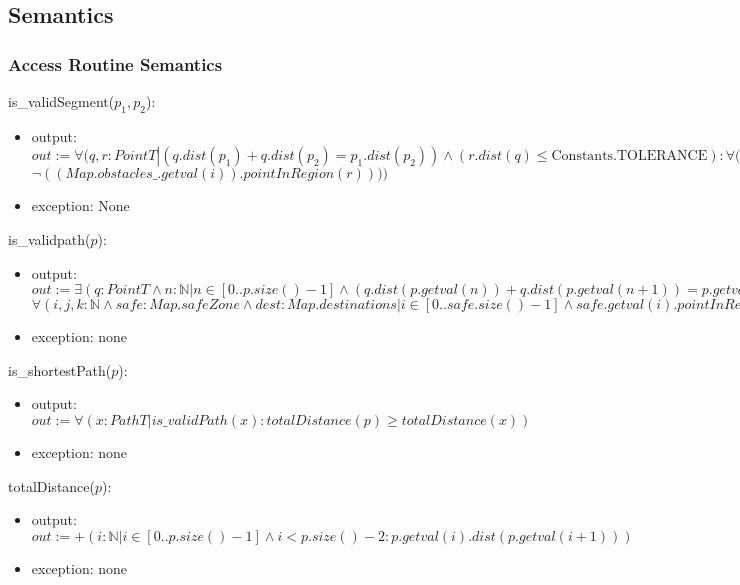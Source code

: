 \documentclass[12pt]{article}
\begin{document}
\subsection* {Semantics}
\subsubsection* {Access Routine Semantics}

\noindent is\_validSegment($p_1, p_2$):
\begin{itemize}
\item output: $\mathit{out} := \forall(q, r : PointT | (q.dist(p_1) + q.dist(p_2) = p_1.dist(p_2)) \land (r.dist(q) \leq \mbox{Constants.TOLERANCE}) : \forall (i : \mathbb{N} | i \in [0..Map.obstacles\_.size()-1] :$
\newline $ \lnot ((Map.obstacles\_.getval(i)).pointInRegion(r))))$
\item exception: None
\end{itemize}

\noindent is\_validpath($p$):
\begin{itemize}
\item output: $out := \exists (q : PointT \land n : \mathbb{N} | n \in [0..p.size()-1] \land  (q.dist(p.getval(n)) + q.dist(p.getval(n+1)) = p.getval(n).dist(Map.Path\_.getval(n+1))))$
\newline $ \forall(i,j,k : \mathbb{N} \land safe : Map.safeZone \land  dest : Map.destinations| i \in [0..safe.size()-1] 
\land safe.getval(i).pointInRegion(p.getval(0)) 
\land safe.getval(i).pointInRegion(p.getval(p.size()-1))
\land j \in [0..dest.size()-1] \land k \in [1..p.size()-1] \land  dest.getval(j).pointInRegion(p.getval(0))  \land dest.getval(j).pointInRegion(p.getval(k)): p.isvalidSegment(p.getval(k-1), p.getval(k)))$

\item exception: none
\end{itemize}

\noindent is\_shortestPath($p$):
\begin{itemize}
\item output: $out := \forall ( x : PathT | is\_validPath(x) : totalDistance(p) \geq totalDistance(x) ) $
\item exception: none
\end{itemize}

\noindent totalDistance($p$):
\begin{itemize}
\item output: $out := + ( i: \mathbb{N}  |  i \in [0 ..  p.size()-1] \land  i < p.size() - 2 :  p.getval(i).dist(p.getval(i+1)) ) $
\item exception: none
\end{itemize}
\end{document}
